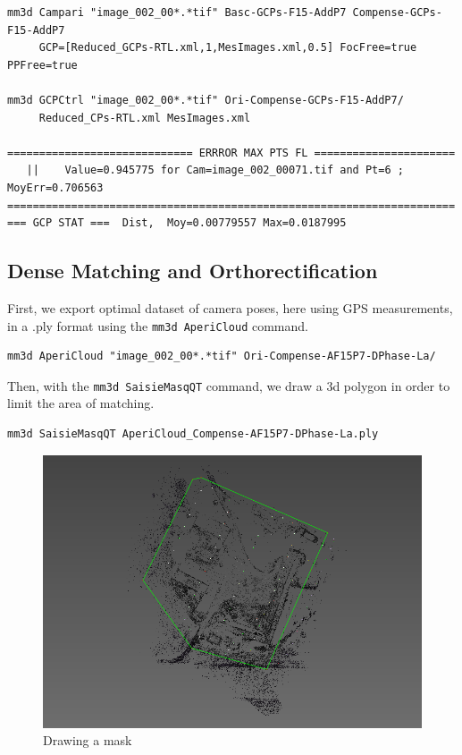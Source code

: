 \begin{verbatim}
mm3d Campari "image_002_00*.*tif" Basc-GCPs-F15-AddP7 Compense-GCPs-F15-AddP7 
     GCP=[Reduced_GCPs-RTL.xml,1,MesImages.xml,0.5] FocFree=true PPFree=true
     
mm3d GCPCtrl "image_002_00*.*tif" Ori-Compense-GCPs-F15-AddP7/ 
     Reduced_CPs-RTL.xml MesImages.xml

============================= ERRROR MAX PTS FL ======================
   ||    Value=0.945775 for Cam=image_002_00071.tif and Pt=6 ; MoyErr=0.706563
======================================================================
=== GCP STAT ===  Dist,  Moy=0.00779557 Max=0.0187995
\end{verbatim}


\subsection{Dense Matching and Orthorectification}
First, we export optimal dataset of camera poses, here using GPS measurements, in a .ply format using the {\tt mm3d AperiCloud} command.
\begin{verbatim}
mm3d AperiCloud "image_002_00*.*tif" Ori-Compense-AF15P7-DPhase-La/
\end{verbatim}

Then, with the {\tt mm3d SaisieMasqQT} command, we draw a 3d polygon in order to limit the area of matching.
\begin{verbatim}
mm3d SaisieMasqQT AperiCloud_Compense-AF15P7-DPhase-La.ply
\end{verbatim}

\begin{figure}[H]
    \begin{center}
    \setlength{\unitlength}{0.5cm}
    \includegraphics[width=0.4\linewidth]{FIGS/Viabon/masq3d.png}
    \end{center}
    \caption{Drawing a mask}
    \label{fig:sel}
\end{figure}

